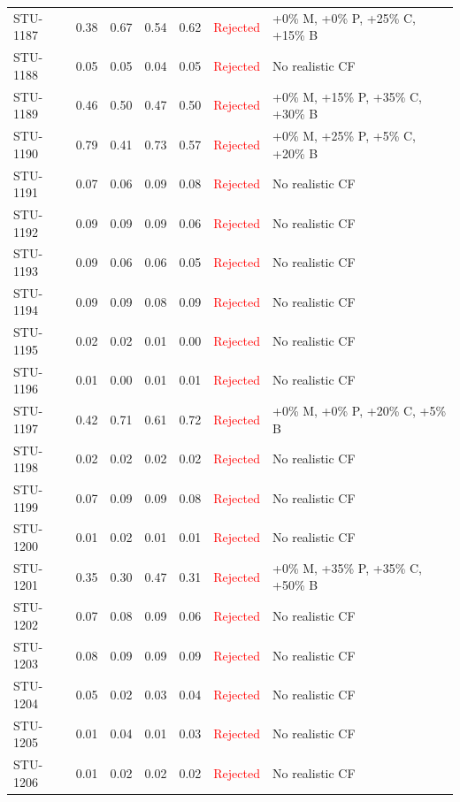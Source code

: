 \begin{longtable}{l c c c c | c | l}
STU-1187 & 0.38 & 0.67 & 0.54 & 0.62 & \textcolor{red}{Rejected} & +0\% M, +0\% P, +25\% C, +15\% B \\
STU-1188 & 0.05 & 0.05 & 0.04 & 0.05 & \textcolor{red}{Rejected} & No realistic CF \\
STU-1189 & 0.46 & 0.50 & 0.47 & 0.50 & \textcolor{red}{Rejected} & +0\% M, +15\% P, +35\% C, +30\% B \\
STU-1190 & 0.79 & 0.41 & 0.73 & 0.57 & \textcolor{red}{Rejected} & +0\% M, +25\% P, +5\% C, +20\% B \\
STU-1191 & 0.07 & 0.06 & 0.09 & 0.08 & \textcolor{red}{Rejected} & No realistic CF \\
STU-1192 & 0.09 & 0.09 & 0.09 & 0.06 & \textcolor{red}{Rejected} & No realistic CF \\
STU-1193 & 0.09 & 0.06 & 0.06 & 0.05 & \textcolor{red}{Rejected} & No realistic CF \\
STU-1194 & 0.09 & 0.09 & 0.08 & 0.09 & \textcolor{red}{Rejected} & No realistic CF \\
STU-1195 & 0.02 & 0.02 & 0.01 & 0.00 & \textcolor{red}{Rejected} & No realistic CF \\
STU-1196 & 0.01 & 0.00 & 0.01 & 0.01 & \textcolor{red}{Rejected} & No realistic CF \\
STU-1197 & 0.42 & 0.71 & 0.61 & 0.72 & \textcolor{red}{Rejected} & +0\% M, +0\% P, +20\% C, +5\% B \\
STU-1198 & 0.02 & 0.02 & 0.02 & 0.02 & \textcolor{red}{Rejected} & No realistic CF \\
STU-1199 & 0.07 & 0.09 & 0.09 & 0.08 & \textcolor{red}{Rejected} & No realistic CF \\
STU-1200 & 0.01 & 0.02 & 0.01 & 0.01 & \textcolor{red}{Rejected} & No realistic CF \\
STU-1201 & 0.35 & 0.30 & 0.47 & 0.31 & \textcolor{red}{Rejected} & +0\% M, +35\% P, +35\% C, +50\% B \\
STU-1202 & 0.07 & 0.08 & 0.09 & 0.06 & \textcolor{red}{Rejected} & No realistic CF \\
STU-1203 & 0.08 & 0.09 & 0.09 & 0.09 & \textcolor{red}{Rejected} & No realistic CF \\
STU-1204 & 0.05 & 0.02 & 0.03 & 0.04 & \textcolor{red}{Rejected} & No realistic CF \\
STU-1205 & 0.01 & 0.04 & 0.01 & 0.03 & \textcolor{red}{Rejected} & No realistic CF \\
STU-1206 & 0.01 & 0.02 & 0.02 & 0.02 & \textcolor{red}{Rejected} & No realistic CF \\

\end{longtable}
